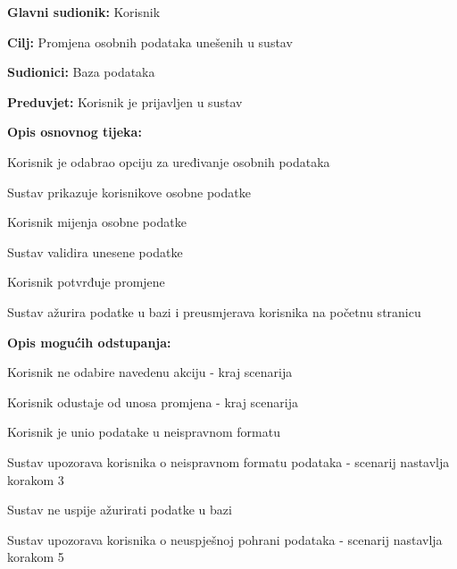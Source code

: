 					\noindent {}
					\begin{packed_item}
	
						\item \textbf{Glavni sudionik: }Korisnik
						\item  \textbf{Cilj:} Promjena osobnih podataka unešenih u sustav
						\item  \textbf{Sudionici:} Baza podataka
						\item  \textbf{Preduvjet:} Korisnik je prijavljen u sustav
						\item  \textbf{Opis osnovnog tijeka:}
					
						\item[] \begin{packed_enum}
							\item Korisnik je odabrao opciju za uređivanje osobnih podataka
							\item Sustav prikazuje korisnikove osobne podatke 
							\item Korisnik mijenja osobne podatke
							\item Sustav validira unesene podatke
							\item Korisnik potvrđuje promjene
							\item Sustav ažurira podatke u bazi i preusmjerava korisnika na početnu stranicu
						\end{packed_enum}

						\eject

						\item  \textbf{Opis mogućih odstupanja:}

						\item[] \begin{packed_item}
							\item[1.a] Korisnik ne odabire navedenu akciju - kraj scenarija
							\item[3.a] Korisnik odustaje od unosa promjena - kraj scenarija
							\item[4.a] Korisnik je unio podatake u neispravnom formatu
							\item[] \begin{packed_enum}
								\item Sustav upozorava korisnika o neispravnom formatu podataka - scenarij nastavlja korakom 3 
							\end{packed_enum}	
							\item[6.a] Sustav ne uspije ažurirati podatke u bazi
							\item[] \begin{packed_enum}
								\item Sustav upozorava korisnika o neuspješnoj pohrani podataka - scenarij nastavlja korakom 5
							\end{packed_enum}					
						\end{packed_item}
					\end{packed_item}	
					
